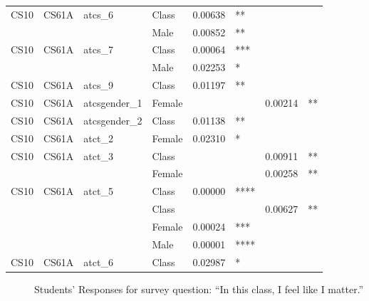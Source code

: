\documentclass[12pt]{article}
\begin{document}
\begin{table}[!htbp]
\begin{tabular}{|l|l|p{2cm}|p{1.5cm}|p{1.5cm}|p{2cm}|p{1.5cm}|p{2cm}|}
CS10 & CS61A & atcs\_6 
& Class  & 0.00638   & ** & & \\
& & & Male   & 0.00852   & ** & & \\ \hline

CS10 & CS61A & atcs\_7 
& Class  & 0.00064   & *** & & \\
& & & Male   & 0.02253   & * & & \\ \hline

CS10 & CS61A & atcs\_9
& Class  & 0.01197   & ** & & \\ \hline

CS10 & CS61A & atcsgender\_1
& Female  & & & 0.00214   & ** \\ \hline

CS10 & CS61A & atcsgender\_2 
& Class  & 0.01138   & ** & & \\ \hline

CS10 & CS61A & atct\_2
& Female & 0.02310   & *& & \\ \hline

CS10 & CS61A & atct\_3 
& Class   & & & 0.00911    & ** \\
& & & Female  & & & 0.00258    & ** \\ \hline

CS10 & CS61A & atct\_5
& Class & 0.00000   & **** & &  \\
& & & Class   & & & 0.00627 & ** \\
& & & Female   & 0.00024   & *** & & \\
& & & Male     & 0.00001   & **** & & \\ \hline

CS10 & CS61A & atct\_6
& Class  & 0.02987   & * & & \\ \hline

\end{tabular}
\label{surveyDisAggregated}
\end{table}



\begin{figure}[!htbp]
  \centering
    \qquad
    \qquad
\caption{Students' Responses for survey question: ``In this class, I feel like I matter.''}
\label{blg_4_dis}
\end{figure}
\end{document}
